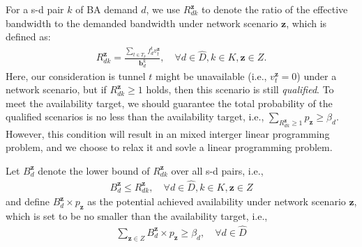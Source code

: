 \documentclass[sigconf]{acmart}
\begin{document}
For a s-d pair $k$ of BA demand $d$, we use $R_{dk}^{\mathbf{z}}$ to denote the ratio of the effective bandwidth to the demanded bandwidth under network scenario $\mathbf{z}$, which is defined as:
 \begin{eqnarray} \label{R2}
R_{dk}^{\mathbf{z}}=\frac{\sum_{t\in T_{k}}f_{d}^tv_t^{\mathbf{z}} }{\mathbf{b}^k_d}, \quad \forall  d \in \hat{D}, k \in K, \mathbf{z}\in Z.
\end{eqnarray}
Here, our consideration is tunnel $t$ might be unavailable (i.e., $v_t^{\mathbf{z}} =0$) under a network scenario, but if $R_{dk}^{\mathbf{z}} \ge 1$ holds, then this scenario is still \textit{qualified}. 
To meet the availability target, we should guarantee the total probability of the qualified scenarios 
is no less than the availability target, i.e., $\sum_{R_{dk}^{\mathbf{z}} \ge 1} p_{\mathbf{z}} \ge \beta_d$.
% 
However, this condition will result in an mixed interger linear programming problem, 
and we choose to relax it and sovle a linear programming problem.

Let $B_d^{\mathbf{z}}$ denote the lower bound of $R_{dk}^{\mathbf{z}}$ over all s-d pairs, i.e.,
\begin{eqnarray} \label{B2}
B_d^{\mathbf{z}} \le R_{dk}^{\mathbf{z}}, \quad  \forall  d \in \hat{D}, k \in K, \mathbf{z}\in Z
\end{eqnarray}
and define $B_d^{\mathbf{z}}\times p_{\mathbf{z}}$ as the potential achieved availability  
under network scenario  $\mathbf{z}$, which is set to be no smaller than the availability target, i.e., 
\begin{eqnarray} \label{Achieved}
\sum_{\mathbf{z}\in Z}B_d^{\mathbf{z}}\times p_{\mathbf{z}} \ge \beta_{d},  \quad {\forall d \in \hat{D}}
\end{eqnarray}
\end{document}
